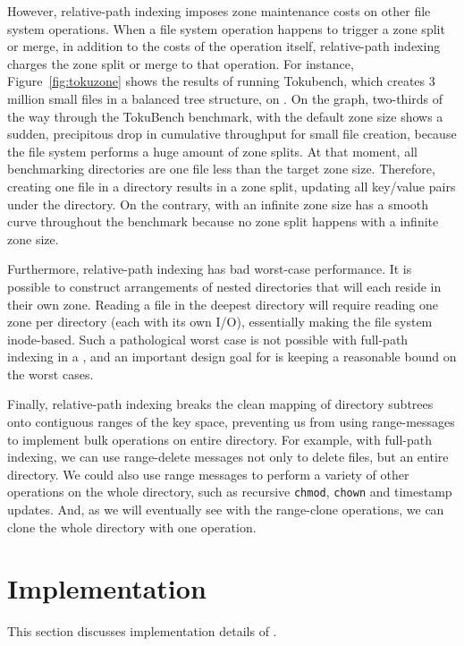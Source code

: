 However, relative-path indexing imposes zone maintenance costs on other file
system operations.
When a file system operation happens to trigger a zone split or merge,
in addition to the costs of the operation itself,
relative-path indexing charges the zone split or merge to that operation.
For instance, Figure~\ref{fig:tokuzone} shows the results of running Tokubench,
which creates 3 million small files in a balanced tree structure,
on \betrfsThree.
On the graph, two-thirds of the way through the TokuBench benchmark,
\betrfsThree with the default zone size shows a sudden,
precipitous drop in cumulative throughput for small file creation,
because the file system performs a huge amount of zone splits.
At that moment, all benchmarking directories are one file less than the target
zone size.
Therefore, creating one file in a directory results in a zone split,
updating all key/value pairs under the directory.
On the contrary, \betrfsThree with an infinite zone size
has a smooth curve throughout the benchmark
because no zone split happens with a infinite zone size.

Furthermore, relative-path indexing has bad worst-case performance.
It is possible to construct arrangements of nested directories that will each
reside in their own zone.
Reading a file in the deepest directory will require reading one zone per
directory (each with its own I/O),
essentially making the file system inode-based.
Such a pathological worst case is not possible with full-path indexing in a
\bet, and an important design goal for \betrfs is keeping a reasonable bound on
the worst cases.

Finally, relative-path indexing breaks the clean mapping of directory subtrees
onto contiguous ranges of the key space,
preventing us from using range-messages to implement bulk operations on entire
directory.
For example, with full-path indexing, we can use range-delete messages not
only to delete files, but an entire directory.
We could also use range messages to perform a variety of other operations on
the whole directory, such as recursive \texttt{chmod}, \texttt{chown} and
timestamp updates.
And, as we will eventually see with the range-clone operations, we can clone the
whole directory with one operation.

\section{Implementation}
\label{sec:bg:impl}

This section discusses implementation details of \fti.

